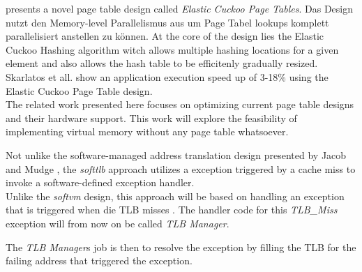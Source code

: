 
\textbf{\cite{skarlatos2020elastic}} presents a novel page table design called \textit{Elastic Cuckoo Page
    Tables}. Das Design nutzt den Memory-level Parallelismus aus um Page Tabel lookups komplett parallelisiert
anstellen zu können. At the core of the design lies the Elastic Cuckoo Hashing algorithm witch allows
multiple hashing locations for a given element and also allows the hash table to be efficitenly gradually
resized. Skarlatos et all. show an application execution speed up of 3-18\% using the Elastic Cuckoo
Page Table design.\\



The related work presented here focuses on optimizing current page table designs and their hardware
support. This work will explore the feasibility of implementing virtual memory without any page table
whatsoever. %


\cite{zagieboylo2020cost}



Not unlike the software-managed address translation design presented by Jacob and Mudge \cite{jacobSoftwaremanagedAddressTranslation1997},
the \textit{softtlb} approach utilizes a exception triggered by a cache miss to invoke a software-defined
exception handler.\\
Unlike the \textit{softvm} design, this approach will be based on handling an exception that is triggered
when die TLB misses .
The handler code for this \textit{TLB\_Miss} exception will from now on be called \textit{TLB Manager}.

The \textit{TLB Manager}s job is then to resolve the exception by filling the TLB for the failing address
that triggered the exception.
